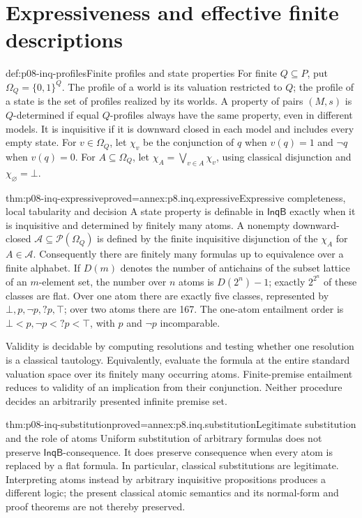 \section{Expressiveness and effective finite descriptions}

\begin{hbdefinition}{def:p08-inq-profiles}{Finite profiles and state properties}
For finite \(Q\subseteq P\), put \(\Omega_Q=\{0,1\}^Q\). The profile
of a world is its valuation restricted to \(Q\); the profile of a state
is the set of profiles realized by its worlds. A property of pairs
\((M,s)\) is \(Q\)-determined if equal \(Q\)-profiles always have the
same property, even in different models. It is inquisitive if it is
downward closed in each model and includes every empty state.
For \(v\in\Omega_Q\), let \(\chi_v\) be the conjunction of \(q\) when
\(v(q)=1\) and \(\neg q\) when \(v(q)=0\). For
\(A\subseteq\Omega_Q\), let \(\chi_A=\bigvee_{v\in A}\chi_v\), using
classical disjunction and \(\chi_\varnothing=\bot\).
\end{hbdefinition}

\begin{hbtheorem}{thm:p08-inq-expressive}{proved=annex:p8.inq.expressive}{Expressive completeness, local tabularity and decision}
A state property is definable in \(\mathsf{InqB}\) exactly when it is
inquisitive and determined by finitely many atoms. A nonempty downward-closed
\(\mathcal A\subseteq\mathcal P(\Omega_Q)\) is defined by the finite
inquisitive disjunction of the \(\chi_A\) for \(A\in\mathcal A\).
Consequently there are finitely many formulas up to equivalence over a finite
alphabet. If \(D(m)\) denotes the number of antichains of the subset lattice
of an \(m\)-element set, the number over \(n\) atoms is \(D(2^n)-1\);
exactly \(2^{2^n}\) of these classes are flat.
Over one atom there are exactly five classes, represented by
\(\bot,p,\neg p,?p,\top\); over two atoms there are 167.
The one-atom entailment order is
\(\bot<p,\neg p<?p<\top\), with \(p\) and \(\neg p\) incomparable.

Validity is decidable by computing resolutions and testing whether one
resolution is a classical tautology. Equivalently, evaluate the formula
at the entire standard valuation space over its finitely many occurring
atoms. Finite-premise entailment reduces to validity of an implication
from their conjunction. Neither procedure decides an arbitrarily presented
infinite premise set.
\end{hbtheorem}

\begin{hbtheorem}{thm:p08-inq-substitution}{proved=annex:p8.inq.substitution}{Legitimate substitution and the role of atoms}
Uniform substitution of arbitrary formulas does not preserve
\(\mathsf{InqB}\)-consequence. It does preserve consequence when every
atom is replaced by a flat formula. In particular, classical substitutions
are legitimate. Interpreting atoms instead by arbitrary inquisitive
propositions produces a different logic; the present classical atomic
semantics and its normal-form and proof theorems are not thereby preserved.
\end{hbtheorem}

